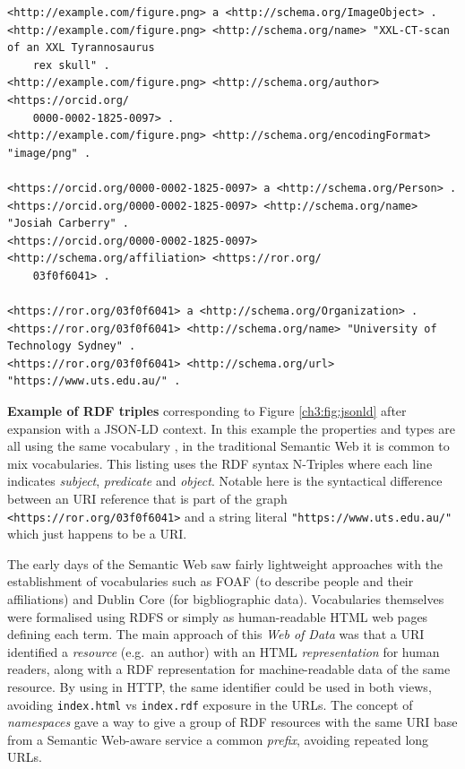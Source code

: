\begin{listing}
  \footnotesize
  \begin{verbatim}
<http://example.com/figure.png> a <http://schema.org/ImageObject> .
<http://example.com/figure.png> <http://schema.org/name> "XXL-CT-scan of an XXL Tyrannosaurus 
	rex skull" .
<http://example.com/figure.png> <http://schema.org/author> <https://orcid.org/
	0000-0002-1825-0097> .
<http://example.com/figure.png> <http://schema.org/encodingFormat> "image/png" .

<https://orcid.org/0000-0002-1825-0097> a <http://schema.org/Person> .
<https://orcid.org/0000-0002-1825-0097> <http://schema.org/name> "Josiah Carberry" .
<https://orcid.org/0000-0002-1825-0097> <http://schema.org/affiliation> <https://ror.org/
	03f0f6041> .

<https://ror.org/03f0f6041> a <http://schema.org/Organization> .
<https://ror.org/03f0f6041> <http://schema.org/name> "University of Technology Sydney" .
<https://ror.org/03f0f6041> <http://schema.org/url> "https://www.uts.edu.au/" .
  \end{verbatim}  
  \caption[Example of RDF triples]{\textbf{Example of RDF triples} corresponding to Figure \vref{ch3:fig:jsonld} after expansion with a JSON-LD context. In this example the properties and types are all using the same vocabulary \cite{schema.org}, in the traditional Semantic Web it is common to mix vocabularies. This listing uses the RDF syntax N-Triples \cite{Carrothers 2014} where each line indicates \emph{subject}, \emph{predicate} and \emph{object}. Notable here is the syntactical difference between an URI reference that is part of the graph \texttt{<https://ror.org/03f0f6041>} and a string literal \texttt{"https://www.uts.edu.au/"} which just happens to be a URI. }
  \label{ch3:triples}
\end{listing}

The early days of the Semantic Web saw fairly lightweight approaches with the establishment of vocabularies such as FOAF (to describe people and their affiliations) and Dublin Core (for bigbliographic data). Vocabularies themselves were formalised using RDFS or simply as human-readable HTML web pages defining each term. The main approach of this \emph{Web of Data} was that a URI identified a \emph{resource} (e.g.~an author) with an HTML \emph{representation} for human readers, along with a RDF representation for machine-readable data of the same resource. By using  in HTTP, the same identifier could be used in both views, avoiding \texttt{index.html} vs \texttt{index.rdf} exposure in the URLs. The concept of \emph{namespaces} gave a way to give a group of RDF resources with the same URI base from a Semantic Web-aware service a common \emph{prefix}, avoiding repeated long URLs.



